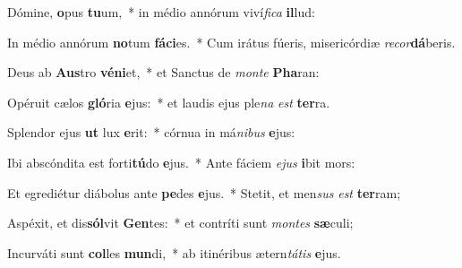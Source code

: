 \item Dómine, \textbf{o}pus \textbf{tu}um,~* in médio annórum viví\textit{fi}\textit{ca} \textbf{il}lud:
\item In médio annórum \textbf{no}tum \textbf{fá}\textbf{ci}es.~* Cum irátus fúeris, misericórdiæ \textit{re}\textit{cor}\textbf{dá}beris.
\item Deus ab \textbf{Aus}tro \textbf{vé}\textbf{ni}et,~* et Sanctus de \textit{mon}\textit{te} \textbf{Pha}ran:
\item Opéruit cælos \textbf{gló}ria \textbf{e}jus:~* et laudis ejus ple\textit{na} \textit{est} \textbf{ter}ra.
\item Splendor ejus \textbf{ut} lux \textbf{e}rit:~* córnua in má\textit{ni}\textit{bus} \textbf{e}jus:
\item Ibi abscóndita est forti\textbf{tú}do \textbf{e}jus.~* Ante fáciem \textit{e}\textit{jus} \textbf{i}bit mors:
\item Et egrediétur diábolus ante \textbf{pe}des \textbf{e}jus.~* Stetit, et men\textit{sus} \textit{est} \textbf{ter}ram;
\item Aspéxit, et dis\textbf{sól}vit \textbf{Gen}tes:~* et contríti sunt \textit{mon}\textit{tes} \textbf{sæ}culi;
\item Incurváti sunt \textbf{col}les \textbf{mun}di,~* ab itinéribus ætern\textit{tá}\textit{tis} \textbf{e}jus.
